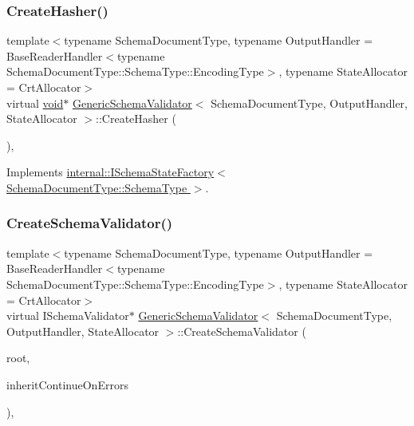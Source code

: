 \mbox{\label{classGenericSchemaValidator_abc377481583ca2095fb784be88887faa}} 
\subsubsection{\texorpdfstring{Create\+Hasher()}{CreateHasher()}}
{\footnotesize\ttfamily template$<$typename Schema\+Document\+Type, typename Output\+Handler = Base\+Reader\+Handler$<$typename Schema\+Document\+Type\+::\+Schema\+Type\+::\+Encoding\+Type$>$, typename State\+Allocator = Crt\+Allocator$>$ \\
virtual \hyperlink{imgui__impl__opengl3__loader_8h_ac668e7cffd9e2e9cfee428b9b2f34fa7}{void}$\ast$ \hyperlink{classGenericSchemaValidator}{Generic\+Schema\+Validator}$<$ Schema\+Document\+Type, Output\+Handler, State\+Allocator $>$\+::Create\+Hasher (\begin{DoxyParamCaption}{ }\end{DoxyParamCaption})\hspace{0.3cm}{\ttfamily [inline]}, {\ttfamily [virtual]}}



Implements \hyperlink{classinternal_1_1ISchemaStateFactory_a4ac37b9d3e9526004c82692473f978f4}{internal\+::\+I\+Schema\+State\+Factory$<$ Schema\+Document\+Type\+::\+Schema\+Type $>$}.

\mbox{\label{classGenericSchemaValidator_a48c724c1255cf1fcc53df75c791423a9}} 
\subsubsection{\texorpdfstring{Create\+Schema\+Validator()}{CreateSchemaValidator()}}
{\footnotesize\ttfamily template$<$typename Schema\+Document\+Type, typename Output\+Handler = Base\+Reader\+Handler$<$typename Schema\+Document\+Type\+::\+Schema\+Type\+::\+Encoding\+Type$>$, typename State\+Allocator = Crt\+Allocator$>$ \\
virtual I\+Schema\+Validator$\ast$ \hyperlink{classGenericSchemaValidator}{Generic\+Schema\+Validator}$<$ Schema\+Document\+Type, Output\+Handler, State\+Allocator $>$\+::Create\+Schema\+Validator (\begin{DoxyParamCaption}\item[{const \hyperlink{classGenericSchemaValidator_ac79628f00f6720bbabb70b44f0d076a0}{Schema\+Type} \&}]{root,  }\item[{const bool}]{inherit\+Continue\+On\+Errors }\end{DoxyParamCaption})\hspace{0.3cm}{\ttfamily [inline]}, {\ttfamily [virtual]}}



